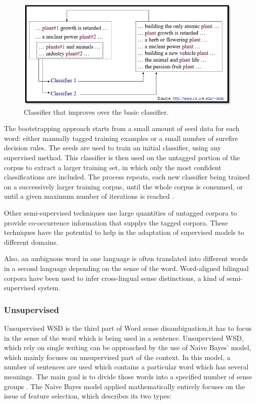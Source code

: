 \begin{figure}[tbh]
	\begin{center}
		\includegraphics[width=\columnwidth]{Union_Background_Chart_semi}
	\end{center}
	\caption{Classifier that improves over the basic classifier. \label{fig3}}
\end{figure}

The bootstrapping approach starts from a small amount of seed data for each word: either manually tagged training examples or a small number of surefire decision rules. 
The seeds are used to train an initial classifier, using any supervised method. This classifier is then used on the untagged portion of the corpus to extract a larger training set, in which only the most confident classifications are included. 
The process repeats, each new classifier being trained on a successively larger training corpus, until the whole corpus is consumed, 
or until a given maximum number of iterations is reached \cite{Blascheck2016}.

Other semi-supervised techniques use large quantities of untagged corpora to provide co-occurrence information that supplys 
the tagged corpora. 
These techniques have the potential to help in the adaptation of supervised models to different domains.

Also, an ambiguous word in one language is often translated into different words in a second language depending on the sense 
of the word. 
Word-aligned bilingual corpora have been used to infer cross-lingual sense distinctions, a kind of semi-supervised system\cite{Cheslow2014}.

\subsubsection*{Unsupervised}
Unsupervised WSD is the third part of Word sense disambiguation,it has to focus in the sense of the word which is being used 
in a sentence.  
Unsupervised WSD, which rely on single writing can be approached by the use of Naive Bayes' model, which mainly focuses on unsupervised part of the context. 
In this model, a number of sentences are used which contains a particular word which has several meanings. 
The main goal is to divide those words into a specified number of sense groups \cite{4028513}.
The Naive Bayes model applied mathematically entirely focuses on the issue of feature selection, which describes its two types:

